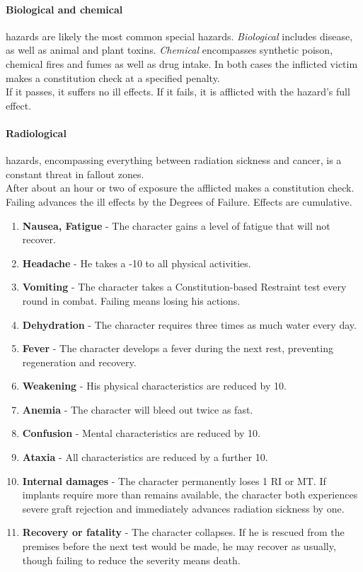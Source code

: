 \documentclass[12pt,a4paper,openany,dvipsnames]{book}
\begin{document}
	\paragraph{Biological and chemical} hazards are likely the most common special hazards. \emph{Biological} includes disease, as well as animal and plant toxins. \emph{Chemical} encompasses synthetic poison, chemical fires and fumes as well as drug intake. In both cases the inflicted victim makes a constitution check at a specified penalty.\\
	If it passes, it suffers no ill effects. If it fails, it is afflicted with the hazard’s full effect.
	\paragraph{Radiological} hazards, encompassing everything between radiation sickness and cancer, is a constant threat in fallout zones.\\
	After about an hour or two of exposure the afflicted makes a constitution check. Failing advances the ill effects by the Degrees of Failure.
	Effects are cumulative.
	\begin{enumerate}
		\setlength\itemsep{-10mm}
		\item \textbf{Nausea, Fatigue} - The character gains a level of fatigue that will not recover.
		\item \textbf{Headache} - He takes a -10 to all physical activities.
		\item \textbf{Vomiting} - The character takes a Constitution-based Restraint test every round in combat. Failing means losing his actions.
		\item \textbf{Dehydration} - The character requires three times as much water every day.
		\item \textbf{Fever} - The character develops a fever during the next rest, preventing regeneration and recovery.
		\item \textbf{Weakening} - His physical characteristics are reduced by 10.
		\item \textbf{Anemia} - The character will bleed out twice as fast.
		\item \textbf{Confusion} - Mental characteristics are reduced by 10.
		\item \textbf{Ataxia} - All characteristics are reduced by a further 10.
		\item \textbf{Internal damages} - The character permanently loses 1 RI or MT. If implants require more than remains available, the character both experiences severe graft rejection and immediately advances radiation sickness by one.
		\item \textbf{Recovery or fatality} - The character collapses. If he is rescued from the premises before the next test would be made, he may recover as usually, though failing to reduce the severity means death.
	\end{enumerate}
\end{document}
